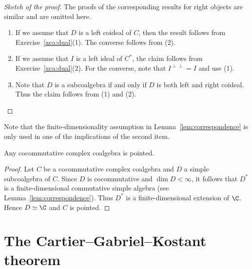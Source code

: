 \begin{proof}[Sketch of the proof]
    The proofs of the corresponding results for right objects are similar and are omitted here.
    \begin{enumerate}
        \item If we assume that $D$ is a left coideal of $C$, then the result 
            follows from Exercise~\ref{xca:dual}(1). The converse follows from (2). 

        \item If we assume that $I$ is a left ideal of $C^*$, the claim 
        follows from Exercise~\ref{xca:dual}(2). For the converse, note
        that $I^{\perp\perp}=I$ and use (1). 
        \item Note that $D$ is a subcoalgebra if and only if 
        $D$ is both left and right coideal. Thus the claim follows from (1) and (2).\qedhere 
    \end{enumerate}
\end{proof}

Note that the finite-dimensionality assumption in Lemma~\ref{lem:correspondence} 
is only used in one of the implications of the second item. 

\begin{theorem}
    Any cocommutative complex coalgebra is pointed.  
\end{theorem}

\begin{proof}
    Let $C$ be a cocommutative complex coalgebra and 
    $D$ a simple subcoalgebra of $C$. Since $D$ is cocommutative and $\dim D<\infty$, it follows that 
    $D^*$ is a finite-dimensional commutative simple algebra (see Lemma~\ref{lem:correspondence}). Thus $D^*$ is a finite-dimensional extension of $\C$. Hence $D\simeq\C$ and 
    $C$ is pointed. 
\end{proof}

\section{The Cartier--Gabriel--Kostant theorem}

